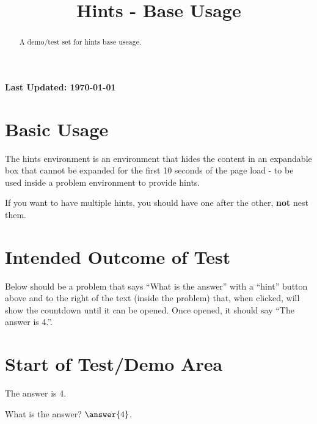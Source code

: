 \documentclass{ximera}
\title{Hints - Base Usage}
\begin{document}
\begin{abstract}
    A demo/test set for hints base useage.
\end{abstract}
\maketitle

{{\Huge \bfseries Last Updated: \today}} \\

\section{Basic Usage}
The hints environment is an environment that hides the content in an expandable box that cannot be expanded for
the first 10 seconds of the page load - to be used inside a problem environment to provide hints.

If you want to have multiple hints, you should have one after the other, \textbf{not} nest them.

\section{Intended Outcome of Test}

Below should be a problem that says ``What is the answer'' with a ``hint'' button above and to the right of the text (inside the problem)
that, when clicked, will show the countdown until it can be opened. Once opened, it should say ``The answer is 4.''.

\section{Start of Test/Demo Area}

\begin{problem}
    \begin{hint}
        The answer is 4.
    \end{hint}
    What is the answer? $\answer{4}$.
\end{problem}

\hrulefill
\end{document}
